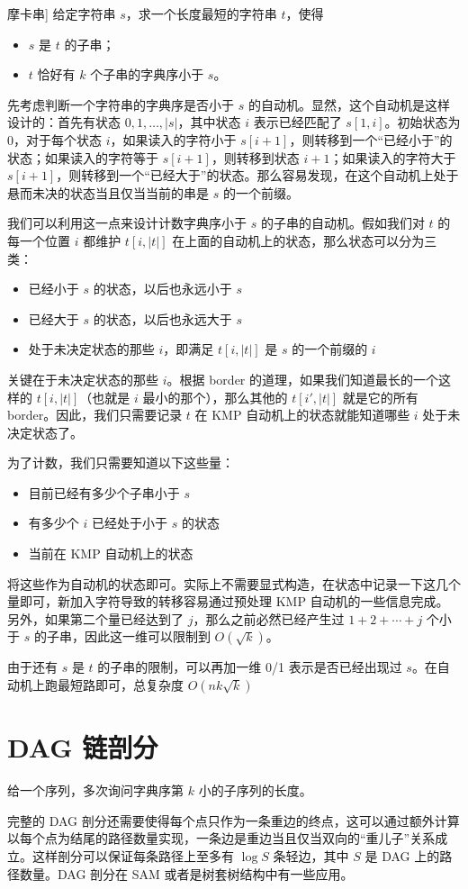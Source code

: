 \begin{example}[P15650 [省选联考 2026] 摩卡串]
    给定字符串 $s$，求一个长度最短的字符串 $t$，使得
    \begin{itemize}
        \item $s$ 是 $t$ 的子串；
        \item $t$ 恰好有 $k$ 个子串的字典序小于 $s$。
    \end{itemize}
\end{example}
\begin{solution}
    先考虑判断一个字符串的字典序是否小于 $s$ 的自动机。显然，这个自动机是这样设计的：首先有状态 $0,1,\ldots,|s|$，其中状态 $i$ 表示已经匹配了 $s[1,i]$。初始状态为 $0$，对于每个状态 $i$，如果读入的字符小于 $s[i+1]$，则转移到一个“已经小于”的状态；如果读入的字符等于 $s[i+1]$，则转移到状态 $i+1$；如果读入的字符大于 $s[i+1]$，则转移到一个“已经大于”的状态。那么容易发现，在这个自动机上处于悬而未决的状态当且仅当当前的串是 $s$ 的一个前缀。

    我们可以利用这一点来设计计数字典序小于 $s$ 的子串的自动机。假如我们对 $t$ 的每一个位置 $i$ 都维护 $t[i,|t|]$ 在上面的自动机上的状态，那么状态可以分为三类：
    \begin{itemize}
        \item 已经小于 $s$ 的状态，以后也永远小于 $s$
        \item 已经大于 $s$ 的状态，以后也永远大于 $s$
        \item 处于未决定状态的那些 $i$，即满足 $t[i,|t|]$ 是 $s$ 的一个前缀的 $i$
    \end{itemize}
    关键在于未决定状态的那些 $i$。根据 border 的道理，如果我们知道最长的一个这样的 $t[i,|t|]$（也就是 $i$ 最小的那个），那么其他的 $t[i',|t|]$ 就是它的所有 border。因此，我们只需要记录 $t$ 在 KMP 自动机上的状态就能知道哪些 $i$ 处于未决定状态了。
    
    为了计数，我们只需要知道以下这些量：
    \begin{itemize}
        \item 目前已经有多少个子串小于 $s$
        \item 有多少个 $i$ 已经处于小于 $s$ 的状态
        \item 当前在 KMP 自动机上的状态
    \end{itemize}
    将这些作为自动机的状态即可。实际上不需要显式构造，在状态中记录一下这几个量即可，新加入字符导致的转移容易通过预处理 KMP 自动机的一些信息完成。另外，如果第二个量已经达到了 $j$，那么之前必然已经产生过 $1+2+\cdots+j$ 个小于 $s$ 的子串，因此这一维可以限制到 $O(\sqrt{k})$。

    由于还有 $s$ 是 $t$ 的子串的限制，可以再加一维 0/1 表示是否已经出现过 $s$。在自动机上跑最短路即可，总复杂度 $O(nk\sqrt{k})$
\end{solution}

\section{DAG 链剖分}

\begin{example}
    给一个序列，多次询问字典序第 $k$ 小的子序列的长度。 
\end{example}

完整的 DAG 剖分还需要使得每个点只作为一条重边的终点，这可以通过额外计算以每个点为结尾的路径数量实现，一条边是重边当且仅当双向的“重儿子”关系成立。这样剖分可以保证每条路径上至多有 $\log S$ 条轻边，其中 $S$ 是 DAG 上的路径数量。DAG 剖分在 SAM 或者是树套树结构中有一些应用。